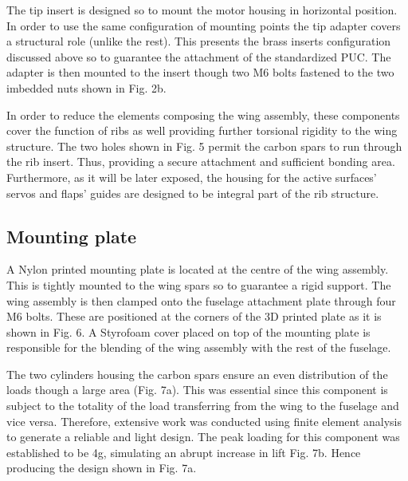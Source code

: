 \documentclass[../../main.tex]{subfiles}
\begin{document}

The tip insert is designed so to mount the motor housing in horizontal position.
In order to use the same configuration of mounting points the tip adapter covers a structural role (unlike the rest).
This presents the brass inserts configuration discussed above so to guarantee the attachment of the standardized PUC.
The adapter is then mounted to the insert though two M6 bolts fastened to the two imbedded nuts shown in Fig. 2b. 

In order to reduce the elements composing the wing assembly, these components cover the function of ribs as well providing further torsional rigidity to the wing structure.
The two holes shown in Fig. 5 permit the carbon spars to run through the rib insert.
Thus, providing a secure attachment and sufficient bonding area.
Furthermore, as it will be later exposed, the housing for the active surfaces’ servos and flaps’ guides are designed to be integral part of the rib structure. 

\subsection{Mounting plate} \label{sec:final-design-proposal:wing:mounting-plate}

A Nylon printed mounting plate is located at the centre of the wing assembly.
This is tightly mounted to the wing spars so to guarantee a rigid support.
The wing assembly is then clamped onto the fuselage attachment plate through four M6 bolts.
These are positioned at the corners of the 3D printed plate as it is shown in Fig. 6.
A Styrofoam cover placed on top of the mounting plate is responsible for the blending of the wing assembly with the rest of the fuselage. 


The two cylinders housing the carbon spars ensure an even distribution of the loads though a large area (Fig. 7a).
This was essential since this component is subject to the totality of the load transferring from the wing to the fuselage and vice versa.
Therefore, extensive work was conducted using finite element analysis to generate a reliable and light design.
The peak loading for this component was established to be 4g, simulating an abrupt increase in lift Fig. 7b.
Hence producing the design shown in Fig. 7a. 
\end{document}
